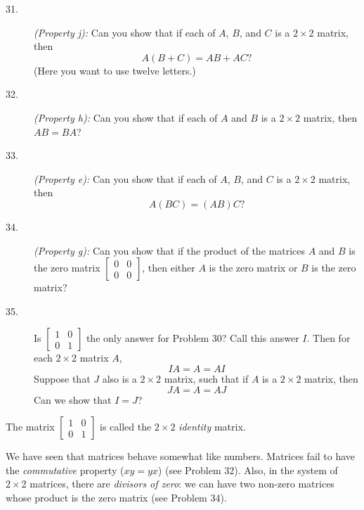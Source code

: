 \documentclass{article}
\begin{document}
\begin{description}
  \item[31.] \emph{(Property j):} Can you show that if each of $A$, $B$, and $C$ is a $2 \times 2$ matrix, then
    \begin{equation*}
    A(B+C) = AB+AC ?
    \end{equation*}
    (Here you want to use twelve letters.) 

  \item[32.] \emph{(Property h):} Can you show that if each of $A$ and $B$ is a $2 \times 2$ matrix, then $AB = BA$? 

  \item[33.] \emph{(Property e):} Can you show that if each of $A$, $B$, and $C$ is a $2 \times 2$ matrix, then 
    \begin{equation*}
    A(BC) = (AB)C ?
    \end{equation*}

  \item[34.] \emph{(Property g):} Can you show that if the product of the matrices $A$ and $B$ is the zero matrix $\begin{bmatrix} 0 & 0 \\ 0 & 0 \end{bmatrix}$, then either $A$ is the zero matrix or $B$ is the zero matrix?

  \item[35.] Is $\begin{bmatrix} 1 & 0 \\ 0 & 1 \end{bmatrix}$ the only answer for Problem 30? Call this answer $I$. Then for each $2 \times 2$ matrix $A$,
    \begin{equation*}
    IA = A = AI
    \end{equation*}
    Suppose that $J$ also is a $2 \times 2$ matrix, such that if $A$ is a $2 \times 2$ matrix, then
    \begin{equation*}
    JA = A = AJ
    \end{equation*}
    Can we show that $I = J$? 

\end{description}

The matrix $\begin{bmatrix} 1 & 0 \\ 0 & 1 \end{bmatrix}$ is called the $2 \times 2$ \emph{identity} matrix.

We have seen that matrices behave somewhat like numbers. Matrices fail to have the \emph{commutative} property ($xy = yx$) (see Problem 32). Also, in the system of $2 \times 2$ matrices, there are \emph{divisors of zero}: we can have two non-zero matrices whose product is the zero matrix (see Problem 34).
\end{document}
